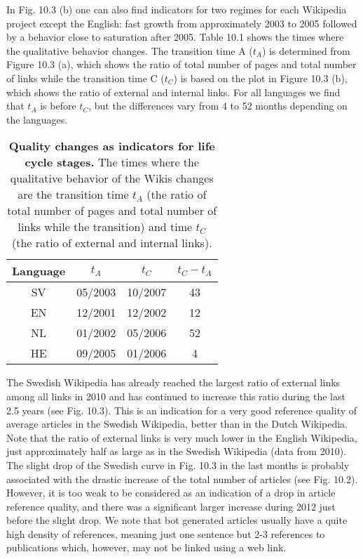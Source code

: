 \documentclass[a4paper,10pt]{scrbook}
\begin{document}
In Fig. 10.3 (b) one can also find 
indicators for two regimes for each Wikipedia project except the English: fast growth from 
approximately 2003 to 2005 followed by a behavior close to saturation after 2005. Table 10.1
shows the times where the qualitative behavior changes. The transition time A ($t_A$) is 
determined from Figure 10.3 (a), which shows the ratio of total number of pages and total number 
of links while the transition time C ($t_C$) is based on the plot in Figure 10.3 (b), which shows 
the ratio of external and internal links. For all languages we find that $t_A$ is before 
$t_C$, but the differences vary from 4 to 52 months depending on the languages.  
 
\begin{table}[h!]
\begin{center}
\begin{tabular}{c|c|c|c}
Language & $t_A$ & $t_C$ & $t_C - t_A$\\ \hline
SV & 05/2003 & 10/2007 & 43\\
EN & 12/2001 & 12/2002 & 12\\
NL & 01/2002 & 05/2006 & 52\\
HE & 09/2005 & 01/2006 & 4
\caption{\textbf{Quality changes as indicators for life cycle stages.} The times where the qualitative behavior of the Wikis changes are the transition time $t_A$ (the ratio of total number of pages and total number of links while the transition) and time $t_C$ (the ratio of external and internal links).}
\label{Tab:2}
\end{tabular}
\end{center}
\end{table}

The Swedish Wikipedia has already reached the largest ratio of external links among all links 
in 2010 and has continued to increase this ratio during the last 2.5 years (see Fig. 10.3). 
This is an indication for a very good reference quality of average articles in the Swedish 
Wikipedia, better than in the Dutch Wikipedia. Note that the ratio of external links is very 
much lower in the English Wikipedia, just approximately half as large as in the Swedish 
Wikipedia (data from 2010). The slight drop of the Swedish curve in Fig. 10.3 in the last 
months is probably associated with the drastic increase of the total number of articles 
(see Fig. 10.2). However, it is too weak to be considered as an indication of a drop in 
article reference quality, and there was a significant larger increase during 2012 just 
before the slight drop. We note that  bot generated articles usually have a quite high 
density of references, meaning just one sentence but 2-3 references to publications which, however, may not be linked using a web link. 
\end{document}
